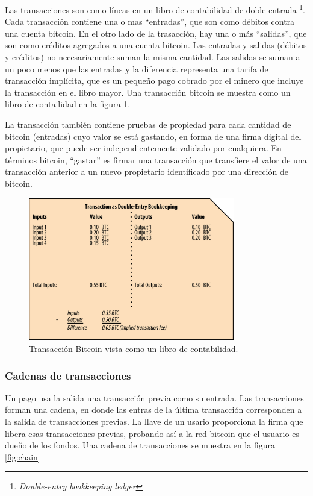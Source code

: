 \documentclass[10pt,journal,compsoc]{IEEEtran}
\begin{document}
Las transacciones son como líneas en un libro de contabilidad de doble entrada \footnote{\emph{Double-entry bookkeeping ledger}}. Cada transacción contiene una o mas ``entradas'', que son como débitos contra una cuenta bitcoin. En el otro lado de la trasacción, hay una o más ``salidas'', que son como créditos agregados a una cuenta bitcoin. Las entradas y salidas (débitos y créditos) no necesariamente suman la misma cantidad. Las salidas se suman a un poco menos que las entradas y la diferencia representa una tarifa de transacción implícita, que es un pequeño pago cobrado por el minero que incluye la transacción en el libro mayor. Una transacción bitcoin se muestra como un libro de contailidad en la figura \ref{fig:bookkepping}.

La transacción también contiene pruebas de propiedad para cada cantidad de bitcoin (entradas) cuyo valor se está gastando, en forma de una firma digital del propietario, que puede ser independientemente validado por cualquiera. En términos bitcoin, ``gastar'' es firmar una transacción que transfiere el valor de una transacción anterior a un nuevo propietario identificado por una dirección de bitcoin.

\begin{figure}[h]
    \center
    \includegraphics[width=9cm]{bookkepping}
    \caption{Transacción Bitcoin vista como un libro de contabilidad.}
    \label{fig:bookkepping}
\end{figure}

\subsubsection{Cadenas de transacciones}
Un pago usa la salida una transacción previa como su entrada. Las transacciones forman una cadena, en donde las entras de la última transacción corresponden a la salida de transacciones previas. La llave de un usario proporciona la firma que libera esas transacciones previas, probando así a la red bitcoin que el usuario es dueño de los fondos. Una cadena de transacciones se muestra en la figura \ref{fig:chain}
\end{document}
